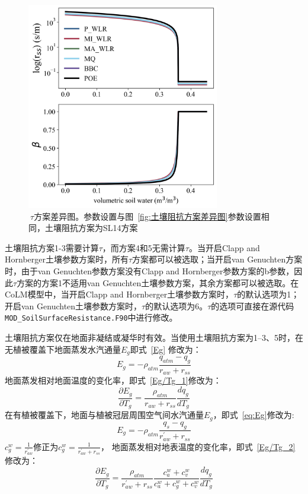 {
\begin{figure}[htbp]
\centering
\includegraphics[width=0.75\textwidth]{Figures/地表湍流交换过程/tau方案差异图.png}
\caption{\(\ \tau\)方案差异图。参数设置与图~\ref{fig:土壤阻抗方案差异图}参数设置相同，土壤阻抗方案为SL14方案}
\label{fig:tau方案差异图}
\end{figure}
}

土壤阻抗方案1-3需要计算\(\tau\)，而方案4和5无需计算\(\tau\)。当开启Clapp and Hornberger土壤参数方案时，所有\(\tau\)方案都可以被选取；当开启van Genuchten方案时，由于van Genuchten参数方案没有Clapp and Hornberger参数方案的b参数，因此\(\tau\)方案的方案1不适用van Genuchten土壤参数方案，其余方案都可以被选取。在CoLM模型中，当开启Clapp and Hornberger土壤参数方案时，\(\tau\)的默认选项为1；开启van Genuchten土壤参数方案时，\(\tau\)的默认选项为6。\(\tau\)的选项可直接在源代码\texttt{MOD\_SoilSurfaceResistance.F90}中进行修改。

土壤阻抗方案仅在地面非凝结或凝华时有效。当使用土壤阻抗方案为1--3、5时，在无植被覆盖下地面蒸发水汽通量\(E_{g}\)即式~\eqref{Eg} 修改为：
\begin{equation}
E_{g}=-\rho_{atm} \frac{q_{atm}-q_{g}}{r_{a w} + r_{s s}}
\end{equation}
地面蒸发相对地面温度的变化率，即式~\eqref{Eg/Tg_1}修改为：
\begin{equation}
     \frac{\partial E_{g}}{\partial T_{g}}= \frac{\rho_{atm}}{r_{a w} + r_{s s}} \frac{d q_{g}}{d T_{g}}
\end{equation}
在有植被覆盖下，地面与植被冠层周围空气间水汽通量\(E_{g}\)，即式~\eqref{eq:Eg}修改为:
\begin{equation}
E_{g}=-\rho_{atm} \frac{q_{s}-q_{g}}{r_{a w}^{\prime}+r_{ss}}
\end{equation}
$c_g^w=\frac{1}{r_{aw}^\prime}$修正为$c_g^w=\frac{1}{r_{aw} ^\prime+r_{ss}}$，
地面蒸发相对地表温度的变化率，即式~\eqref{Eg/Tg_2} 修改为：
\begin{equation}
\frac{\partial E_{g}}{\partial T_{g}}=
      \frac{\rho_{atm}}{r_{a w}^{\prime} + r_{s s}} \frac{c_{a}^{w}+c_{v}^{w}}{c_{a}^{w}+c_{g}^{w}+c_{v}^{w}} \frac{d q_{g}}{d T_{g}}
\end{equation}

